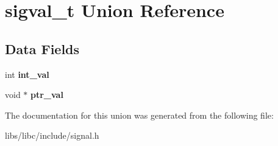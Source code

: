 \hypertarget{unionsigval__t}{}\section{sigval\+\_\+t Union Reference}
\label{unionsigval__t}
\subsection*{Data Fields}
\begin{DoxyCompactItemize}
\item 
int {\bfseries int\+\_\+val}\hypertarget{unionsigval__t_a0e3ab146634043fa223dbad430aa42b9}{}\label{unionsigval__t_a0e3ab146634043fa223dbad430aa42b9}

\item 
void $\ast$ {\bfseries ptr\+\_\+val}\hypertarget{unionsigval__t_af8f8e8f079e2453a8b48ed07e235bfea}{}\label{unionsigval__t_af8f8e8f079e2453a8b48ed07e235bfea}

\end{DoxyCompactItemize}


The documentation for this union was generated from the following file\+:\begin{DoxyCompactItemize}
\item 
libs/libc/include/signal.\+h\end{DoxyCompactItemize}
